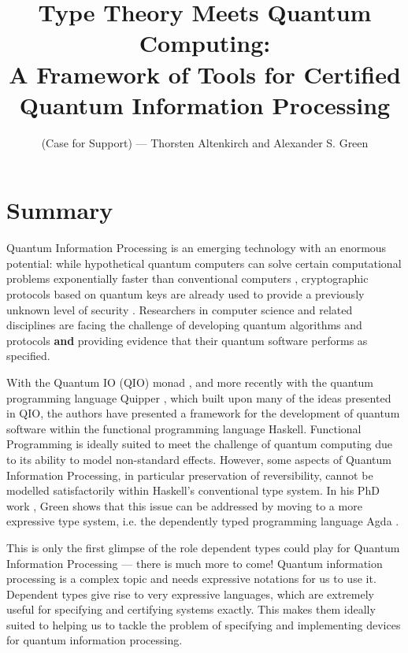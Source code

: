 \documentclass[a4paper]{article}
\title{Type Theory Meets Quantum Computing:\\
 \Large A Framework of Tools for Certified Quantum Information Processing
}
\author{(Case for Support) --- Thorsten Altenkirch and Alexander S. Green}
\date{}
\begin{document}
\maketitle
\section*{Summary}
Quantum Information Processing is an emerging technology with an enormous
potential: while hypothetical quantum computers can solve certain
computational problems exponentially faster than conventional
computers ,
cryptographic protocols based on quantum keys  are
already used to provide a previously unknown level of security
. Researchers in
computer science and related disciplines are facing the challenge of
developing quantum algorithms  and protocols \textbf{and}
providing evidence that their quantum software performs as
specified. 

With the Quantum IO (QIO) monad
, and more recently with the quantum
programming language Quipper ,
which built upon many of the ideas presented in QIO, the authors have
presented a framework for the development of quantum software within
the functional programming language Haskell. Functional
Programming is ideally suited to meet the challenge of quantum
computing due to its ability to model
non-standard effects. However, some aspects of Quantum Information Processing,
in particular preservation of reversibility, cannot be modelled satisfactorily
within Haskell's conventional type system. In his PhD work
, Green shows that this issue can be addressed
by moving to a more expressive type system, i.e. the dependently typed
programming language Agda . 

This is only the first glimpse of the role dependent types could play
for Quantum Information Processing --- there is much more to come!
Quantum information processing is a complex topic and needs expressive
notations for us to use it. Dependent types give rise to very expressive
languages, which are extremely useful for specifying and certifying systems exactly.
This makes them ideally suited to helping us to tackle the
problem of specifying and implementing devices for quantum information
processing. 

\end{document}
